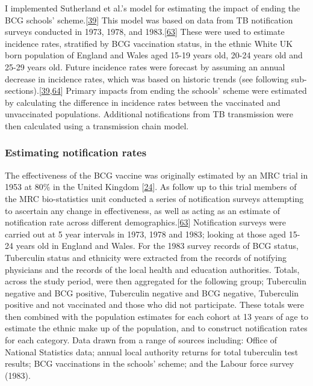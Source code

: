 \documentclass[11pt,twoside]{bristolthesis}
\begin{document}
  I implemented Sutherland et al.'s model for estimating the impact of ending the BCG schools' scheme.{[}\protect\hyperlink{ref-Sutherland1989}{39}{]} This model was based on data from TB notification surveys conducted in 1973, 1978, and 1983.{[}\protect\hyperlink{ref-Sutherland1987a}{63}{]} These were used to estimate incidence rates, stratified by BCG vaccination status, in the ethnic White UK born population of England and Wales aged 15-19 years old, 20-24 years old and 25-29 years old. Future incidence rates were forecast by assuming an annual decrease in incidence rates, which was based on historic trends (see following sub-sections).{[}\protect\hyperlink{ref-Sutherland1989}{39},\protect\hyperlink{ref-Springett1988}{64}{]} Primary impacts from ending the schools' scheme were estimated by calculating the difference in incidence rates between the vaccinated and unvaccinated populations. Additional notifications from TB transmission were then calculated using a transmission chain model.
  
  \hypertarget{estimating-notification-rates}{%
  \subsubsection{Estimating notification rates}\label{estimating-notification-rates}}
  
  The effectiveness of the BCG vaccine was originally estimated by an MRC trial in 1953 at 80\% in the United Kingdom {[}\protect\hyperlink{ref-Hart1972}{24}{]}. As follow up to this trial members of the MRC bio-statistics unit conducted a series of notification surveys attempting to ascertain any change in effectiveness, as well as acting as an estimate of notification rate across different demographics.{[}\protect\hyperlink{ref-Sutherland1987a}{63}{]} Notification surveys were carried out at 5 year intervals in 1973, 1978 and 1983; looking at those aged 15-24 years old in England and Wales. For the 1983 survey records of BCG status, Tuberculin status and ethnicity were extracted from the records of notifying physicians and the records of the local health and education authorities. Totals, across the study period, were then aggregated for the following group; Tuberculin negative and BCG positive, Tuberculin negative and BCG negative, Tuberculin positive and not vaccinated and those who did not participate. These totals were then combined with the population estimates for each cohort at 13 years of age to estimate the ethnic make up of the population, and to construct notification rates for each category. Data drawn from a range of sources including: Office of National Statistics data; annual local authority returns for total tuberculin test results; BCG vaccinations in the schools' scheme; and the Labour force survey (1983).
  
\end{document}
